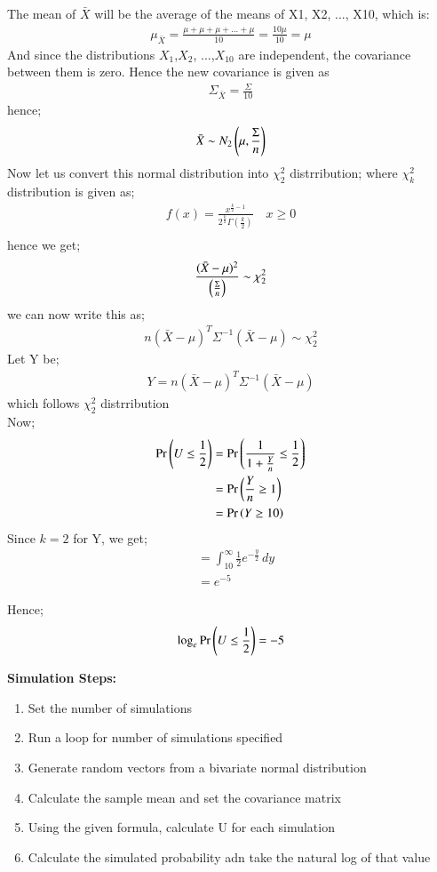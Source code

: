 \documentclass[journal,12pt,onecolumn]{IEEEtran}
\theoremstyle{remark}
\begin{document}
The mean of $\bar{X}$ will be the average of the means of X1, X2, ..., X10, which is:
\begin{align}
    \mu_{\bar{X}} =\frac{\mu + \mu + \mu + ... + \mu}{10} = \frac{10\mu}{10} = \mu   
\end{align}
And since the distributions $X_1$,$X_2$, ...,$X_{10}$ are independent, the covariance between them is zero. Hence the 
new covariance is given as
\begin{align}
    \Sigma_{\bar{X}} = \frac{\Sigma}{10}
\end{align}
hence;
\begin{align}
    \bar{X} \sim N_2\left(\mu,\frac{\Sigma}{n}\right)
\end{align}
Now let us convert this normal distribution into $\chi^{2}_{2}$ distrribution; where $\chi^{2}_{k}$ distribution is given as;
\begin{align}
    f(x) = \frac{x^{\frac{k}{2}-1}}{2^{\frac{k}{2}}\Gamma(\frac{k}{2})} \quad  x \ge 0\\
\end{align}
hence we get;
\begin{align}
    \frac{(\bar{X}-\mu)^2}{\left(\frac{\Sigma}{n}\right)} \sim \chi^{2}_{2}
\end{align}
we can now write this as;
\begin{align}
    n(\bar{X} - \mu)^T\Sigma^{-1}(\bar{X} - \mu) \sim \chi^{2}_{2}
\end{align}
Let Y be;
\begin{align}
    Y = n(\bar{X} - \mu)^T\Sigma^{-1}(\bar{X} - \mu)
\end{align}
which follows $\chi^{2}_{2}$ distrribution\\
Now;
\begin{align}
    \Pr\left(U \le \frac{1}{2}\right)
    &= \Pr\left(\frac{1}{1+\frac{Y}{n}} \le \frac{1}{2}\right)\\
    &= \Pr\left(\frac{Y}{n} \ge 1\right)\\
    &= \Pr\left(Y \ge 10\right)
\end{align}
Since $k=2$ for Y, we get;
\begin{align}
    &= \int_{10}^{\infty} \frac{1}{2}e^{-\frac{y}{2}} \,dy\\
    &= e^{-5}   
\end{align}

Hence;
\begin{align}
    \log_e \Pr\left(U \le \frac{1}{2}\right) = -5
\end{align}

\textbf{Simulation Steps:}
\begin{enumerate}
    \item Set the number of simulations
    \item Run a loop for number of simulations specified
    \item Generate random vectors from a bivariate normal distribution
    \item Calculate the sample mean and set the covariance matrix
    \item Using the given formula, calculate U for each simulation
    \item Calculate the simulated probability adn take the natural log of that value
\end{enumerate}
\end{document}
